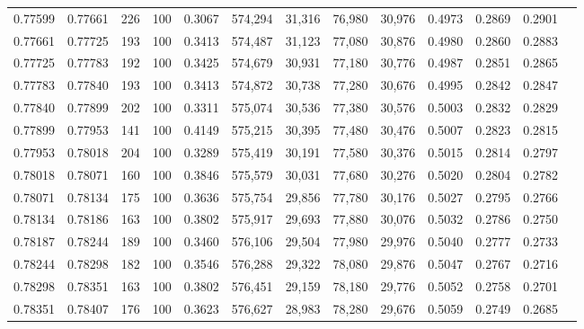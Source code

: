 \begin{tabular}{rrrrrrrrrrrrr}
0.77599 & 0.77661 &   226 & 100 &                                     0.3067 & 574,294 &  31,316 &  76,980 &  30,976 & 0.4973 & 0.2869 & 0.2901 \\
0.77661 & 0.77725 &   193 & 100 &                                     0.3413 & 574,487 &  31,123 &  77,080 &  30,876 & 0.4980 & 0.2860 & 0.2883 \\
0.77725 & 0.77783 &   192 & 100 &                                     0.3425 & 574,679 &  30,931 &  77,180 &  30,776 & 0.4987 & 0.2851 & 0.2865 \\
0.77783 & 0.77840 &   193 & 100 &                                     0.3413 & 574,872 &  30,738 &  77,280 &  30,676 & 0.4995 & 0.2842 & 0.2847 \\
0.77840 & 0.77899 &   202 & 100 &                                     0.3311 & 575,074 &  30,536 &  77,380 &  30,576 & 0.5003 & 0.2832 & 0.2829 \\
0.77899 & 0.77953 &   141 & 100 &                                     0.4149 & 575,215 &  30,395 &  77,480 &  30,476 & 0.5007 & 0.2823 & 0.2815 \\
0.77953 & 0.78018 &   204 & 100 &                                     0.3289 & 575,419 &  30,191 &  77,580 &  30,376 & 0.5015 & 0.2814 & 0.2797 \\
0.78018 & 0.78071 &   160 & 100 &                                     0.3846 & 575,579 &  30,031 &  77,680 &  30,276 & 0.5020 & 0.2804 & 0.2782 \\
0.78071 & 0.78134 &   175 & 100 &                                     0.3636 & 575,754 &  29,856 &  77,780 &  30,176 & 0.5027 & 0.2795 & 0.2766 \\
0.78134 & 0.78186 &   163 & 100 &                                     0.3802 & 575,917 &  29,693 &  77,880 &  30,076 & 0.5032 & 0.2786 & 0.2750 \\
0.78187 & 0.78244 &   189 & 100 &                                     0.3460 & 576,106 &  29,504 &  77,980 &  29,976 & 0.5040 & 0.2777 & 0.2733 \\
0.78244 & 0.78298 &   182 & 100 &                                     0.3546 & 576,288 &  29,322 &  78,080 &  29,876 & 0.5047 & 0.2767 & 0.2716 \\
0.78298 & 0.78351 &   163 & 100 &                                     0.3802 & 576,451 &  29,159 &  78,180 &  29,776 & 0.5052 & 0.2758 & 0.2701 \\
0.78351 & 0.78407 &   176 & 100 &                                     0.3623 & 576,627 &  28,983 &  78,280 &  29,676 & 0.5059 & 0.2749 & 0.2685 \\

\end{tabular}
